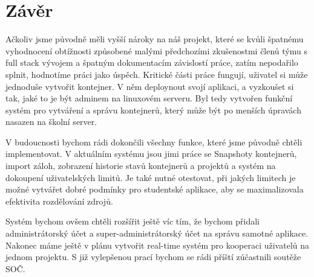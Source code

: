 \chapter*{Závěr}

Ačkoliv jsme původně měli vyšší nároky na náš projekt, které se kvůli špatnému vyhodnocení obtížnosti způsobené malými předchozími zkušenostmi členů týmu s full stack vývojem a špatným dokumentacím závislostí práce, zatím nepodařilo splnit, hodnotíme práci jako úspěch. Kritické části práce fungují, uživatel si může jednoduše vytvořit kontejner. V něm deploynout svojí aplikaci, a vyzkoušet si tak, jaké to je být adminem na linuxovém serveru. Byl tedy vytvořen funkční systém pro vytváření a správu kontejnerů, který může být po menších úpravách nasazen na školní server.

V budoucnosti bychom rádi dokončili všechny funkce, které jsme původně chtěli implementovat. V aktuálním systému jsou jimi práce se Snapshoty kontejnerů, import záloh, zobrazení historie stavů kontejnerů a projektů a systém na dokoupení uživatelských limitů. Je také nutné otestovat, při jakých limitech je možné vytvářet dobré podmínky pro studentské aplikace, aby se maximalizovala efektivita rozdělování zdrojů.

Systém bychom ovšem chtěli rozšířit ještě víc tím, že bychom přidali administrátorský účet a super-administrátorský účet na správu samotné aplikace. Nakonec máme ještě v plánu vytvořit real-time systém pro kooperaci uživatelů na jednom projektu. S již vylepšenou prací bychom se rádi příští zúčastnili soutěže SOČ.


